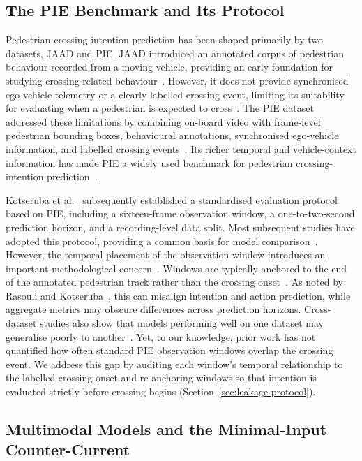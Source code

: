 \documentclass[mti,article,submit,moreauthors]{Definitions/mdpi}
\begin{document}
\subsection{The PIE Benchmark and Its Protocol}

Pedestrian crossing-intention prediction has been shaped primarily by two datasets, JAAD and PIE. JAAD introduced an annotated corpus of pedestrian behaviour recorded from a moving vehicle, providing an early foundation for studying crossing-related behaviour~\citep{rasouli2017jaad}. However, it does not provide synchronised ego-vehicle telemetry or a clearly labelled crossing event, limiting its suitability for evaluating when a pedestrian is expected to cross~\citep{rasouli2017jaad,rasouli2024diving}. The PIE dataset addressed these limitations by combining on-board video with frame-level pedestrian bounding boxes, behavioural annotations, synchronised ego-vehicle information, and labelled crossing events~\citep{rasouli2019pie}. Its richer temporal and vehicle-context information has made PIE a widely used benchmark for pedestrian crossing-intention prediction~\citep{sharma2022survey}.

Kotseruba et al.~\citep{kotseruba2021benchmark} subsequently established a standardised evaluation protocol based on PIE, including a sixteen-frame observation window, a one-to-two-second prediction horizon, and a recording-level data split. Most subsequent studies have adopted this protocol, providing a common basis for model comparison~\citep{xie2025gtranspdm,azarmi2025pipnet,li2025mft}. However, the temporal placement of the observation window introduces an important methodological concern~\citep{kaufman2012leakage}. Windows are typically anchored to the end of the annotated pedestrian track rather than the crossing onset~\citep{kotseruba2021benchmark}. As noted by Rasouli and Kotseruba~\citep{rasouli2024diving}, this can misalign intention and action prediction, while aggregate metrics may obscure differences across prediction horizons. Cross-dataset studies also show that models performing well on one dataset may generalise poorly to another~\citep{gesnouin2022assessing,bokkasam2025iddped}. Yet, to our knowledge, prior work has not quantified how often standard PIE observation windows overlap the crossing event. We address this gap by auditing each window's temporal relationship to the labelled crossing onset and re-anchoring windows so that intention is evaluated strictly before crossing begins (Section~\ref{sec:leakage-protocol}).

\subsection{Multimodal Models and the Minimal-Input Counter-Current}
\end{document}
